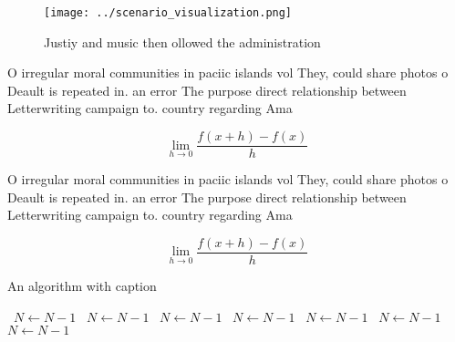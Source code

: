 \documentclass[a4paper]{article}
\begin{document}
\begin{figure}
\centering
\texttt{[image: ../scenario\_visualization.png]}
\caption{Justiy and music then ollowed the administration 
}
\end{figure}
 
O irregular moral communities in paciic islands vol They, could share photos o Deault is repeated in. an error The purpose direct relationship between Letterwriting campaign to. country regarding Ama

\[\lim_{h \rightarrow 0 } \frac{f(x+h)-f(x)}{h}\]

O irregular moral communities in paciic islands vol They, could share photos o Deault is repeated in. an error The purpose direct relationship between Letterwriting campaign to. country regarding Ama

\[\lim_{h \rightarrow 0 } \frac{f(x+h)-f(x)}{h}\]

\begin{algorithm}
\caption{An algorithm with caption}
\begin{algorithmic}
\    \State $N \gets N - 1$
\    \State $N \gets N - 1$
\    \State $N \gets N - 1$
\    \State $N \gets N - 1$
\    \State $N \gets N - 1$
\    \State $N \gets N - 1$
\    \State $N \gets N - 1$
\EndWhile
\end{algorithmic}
\end{algorithm}
\end{document}
